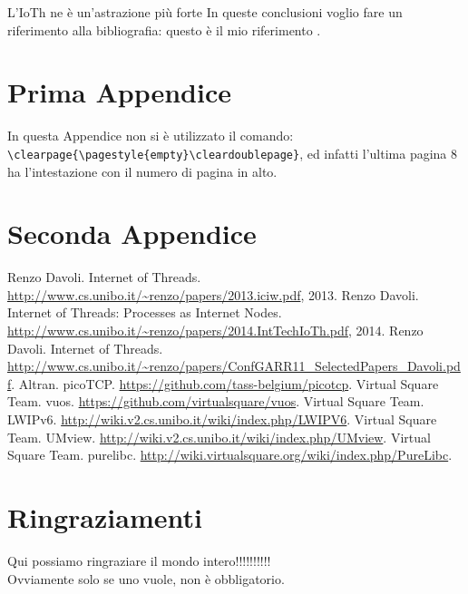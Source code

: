 \documentclass[14pt,a4paper,openright,twoside]{extreport}
\renewcommand{\chaptermark}[1]{\markboth{\thechapter.\ #1}{}}
\begin{document}
L'IoTh ne \`e un'astrazione pi\`u forte
In queste conclusioni voglio fare un riferimento alla
bibliografia: questo \`e il mio riferimento \cite{K3,K4}.
\renewcommand{\chaptermark}[1]{\markright{\thechapter \ #1}{}}
\lhead[\fancyplain{}{\bfseries\thepage}]{\fancyplain{}{\bfseries\rightmark}}
\appendix                               %
\chapter{Prima Appendice}               %
In questa Appendice non si \`e utilizzato il comando:\\
\verb"\clearpage{\pagestyle{empty}\cleardoublepage}", ed infatti
l'ultima pagina 8 ha l'intestazione con il numero di pagina in
alto.
\chapter{Seconda Appendice}             %
\begin{thebibliography}{90}             %
\rhead[\fancyplain{}{\bfseries \leftmark}]{\fancyplain{}{\bfseries
\thepage}}
 Renzo Davoli. Internet of Threads. \url{http://www.cs.unibo.it/~renzo/papers/2013.iciw.pdf}, 2013.
 Renzo Davoli. Internet of Threads: Processes as Internet Nodes. \url{http://www.cs.unibo.it/~renzo/papers/2014.IntTechIoTh.pdf}, 2014.
 Renzo Davoli. Internet of Threads. \url{http://www.cs.unibo.it/~renzo/papers/ConfGARR11_SelectedPapers_Davoli.pdf}.
 Altran. picoTCP. \url{https://github.com/tass-belgium/picotcp}.
 Virtual Square Team. vuos. \url{https://github.com/virtualsquare/vuos}.
 Virtual Square Team. LWIPv6. \url{http://wiki.v2.cs.unibo.it/wiki/index.php/LWIPV6}.
 Virtual Square Team. UMview. \url{http://wiki.v2.cs.unibo.it/wiki/index.php/UMview}.
 Virtual Square Team. purelibc. \url{http://wiki.virtualsquare.org/wiki/index.php/PureLibc}.
\end{thebibliography}
\clearpage{\pagestyle{empty}\cleardoublepage}
\chapter*{Ringraziamenti}
\thispagestyle{empty}
Qui possiamo ringraziare il mondo intero!!!!!!!!!!\\
Ovviamente solo se uno vuole, non \`e obbligatorio.
\end{document}
